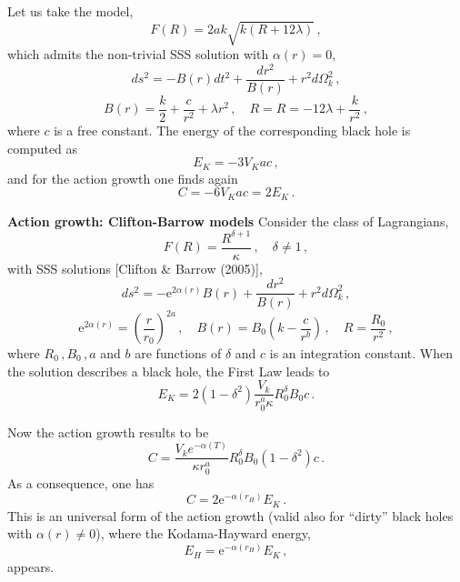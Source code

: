 \documentclass[ignorenonframetext,slidestop,compress]{beamer}
\begin{document}
 \begin{frame}
Let us take the model,
 \begin{equation*}
F(R)=2a k\sqrt{k(R+12\lambda)}\,, 
\end{equation*}
which admits the non-trivial SSS solution with $\alpha(r)=0$, 
\begin{equation*}
ds^2=-B(r)dt^2+\frac{d r^2}{B(r)}+r^2d\Omega^2_k\,, 
\end{equation*}
\begin{equation*}
B(r)=\frac{k}{2}+\frac{c}{r^2}+\lambda r^2\,,\quad R= R=-12\lambda + \frac{k}{r^2}\,,
\end{equation*}
where $c$ is a free constant. The energy of the corresponding black hole is computed as
 \begin{equation*}
 E_K=-3 V_K a c\,,
\end{equation*} 
and for the action growth one finds again  
  \begin{equation*}
 C= -6 V_K a c=2E_K\,.
\end{equation*}
 \end{frame}

\begin{frame}
{\bf Action growth: Clifton-Barrow models}
 Consider the class of Lagrangians, 
\begin{equation*}
F(R)=\frac{R^{\delta+1}}{\kappa}\,,\quad \delta\neq 1\,,
\end{equation*}
with SSS solutions [Clifton \& Barrow (2005)],
\begin{equation*}
ds^2=-\text{e}^{2\alpha(r)}B(r) + \frac{d r^2}{B(r)}+r^2d\Omega^2_k\,, 
\end{equation*}
\begin{equation*}
\text{e}^{2\alpha(r)}=
\left(\frac{r}{r_0}\right)^{2a}
\,,\quad
B(r)=B_0\left(k-\frac{c}{r^b}\right) \,,\quad  R=\frac{R_0}{r^2}\,,
\end{equation*}
where $R_0\,,B_0\,,a$ and $b$ are functions of $\delta$ and $c$ is an integration constant. When the solution describes a black hole, the First Law leads to
\begin{equation*}
E_K=2(1-\delta^2) \frac{V_k}{r_0^a\kappa}R_0^\delta B_0 c\,.
\end{equation*}
\end{frame} 
 
\begin{frame}
Now the action growth results to be
\begin{equation*}
C=
\frac{V_k e^{-\alpha(T)}}{\kappa r_0^a}R_0^\delta B_0(1-\delta^2)  c
\,.
\end{equation*}
As a consequence, one  has 
\begin{equation*}
 C=2 \text{e}^{-\alpha(r_H)} E_K\,.
\end{equation*}
This is an universal form of the action growth (valid also for ``dirty'' black holes with $\alpha(r)\neq 0$), where
the Kodama-Hayward energy,
\begin{equation*}
E_H=\text{e}^{-\alpha(r_H)} E_K\,,
\end{equation*}
appears. 
\end{frame}
\end{document}
